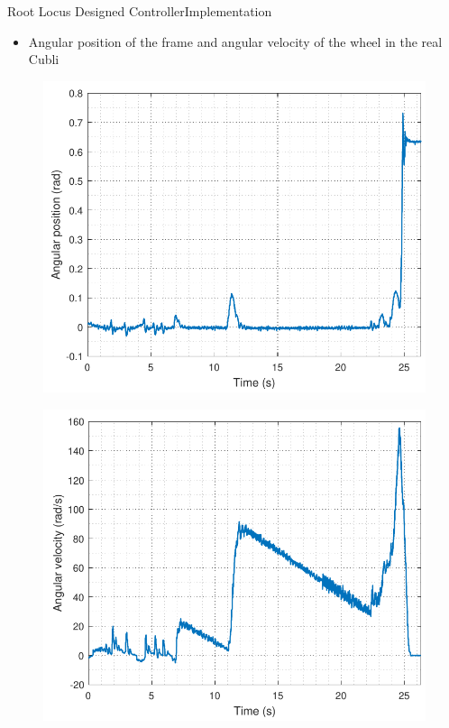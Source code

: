 \begin{frame}{Root Locus Designed Controller}{Implementation}	
\begin{itemize}
	\item Angular position of the frame and angular velocity of the wheel in the real Cubli
\end{itemize}
\begin{minipage}{\linewidth}
	\begin{minipage}{0.4\linewidth}
		\begin{figure}
			\includegraphics[scale=.35]{Pictures/positionRLTest}
			\centering
		\end{figure}
	\end{minipage}
	\hspace{0.1\linewidth}
	\begin{minipage}{0.45\linewidth}
		\begin{figure}[H]
			\includegraphics[scale=.35]{Pictures/wheelRLTest}
			\centering
		\end{figure}
	\end{minipage}
\end{minipage}
\end{frame}
